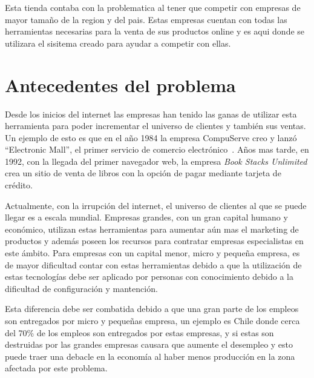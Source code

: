 Esta tienda contaba con la problematica al tener que competir con empresas de mayor 
tamaño de la region y del pais. Estas empresas cuentan con todas las herramientas
necesarias para la venta de sus productos online y es aqui donde se utilizara 
el sisitema creado para ayudar a competir con ellas. 


\section{Antecedentes del problema}

Desde los inicios del internet las empresas han tenido las ganas de utilizar
esta herramienta para poder incrementar el universo de clientes y también sus
ventas.
Un ejemplo de esto es que en el año 1984 la empresa CompuServe creo y lanzó
``Electronic Mall'', el primer servicio de comercio electrónico~\cite{Def:1}.
Años mas tarde, en 1992, con la llegada del primer navegador web, la empresa
\emph{Book Stacks Unlimited} crea un sitio de venta de libros con la opción de
pagar mediante tarjeta de crédito.

Actualmente, con la irrupción del internet, el universo de clientes al que se
puede llegar es a escala mundial.
Empresas grandes, con un gran capital humano y económico, utilizan estas
herramientas para aumentar aún mas el marketing de productos y además poseen los
recursos para contratar empresas especialistas en este ámbito.
Para empresas con un capital menor, micro y pequeña empresa, es de mayor
dificultad contar con estas herramientas debido a que la utilización de estas
tecnologías debe ser aplicado por personas con conocimiento debido a la dificultad
de configuración y mantención.

Esta diferencia debe ser combatida debido a que una gran parte de los empleos
son entregados por micro y pequeñas empresa, un ejemplo es Chile donde cerca del
70\% de los empleos son entregados por estas empresas, y si estas son destruidas
por las grandes empresas causara que aumente el desempleo y esto puede traer una
debacle en la economía al haber menos producción en la zona afectada por este
problema.
